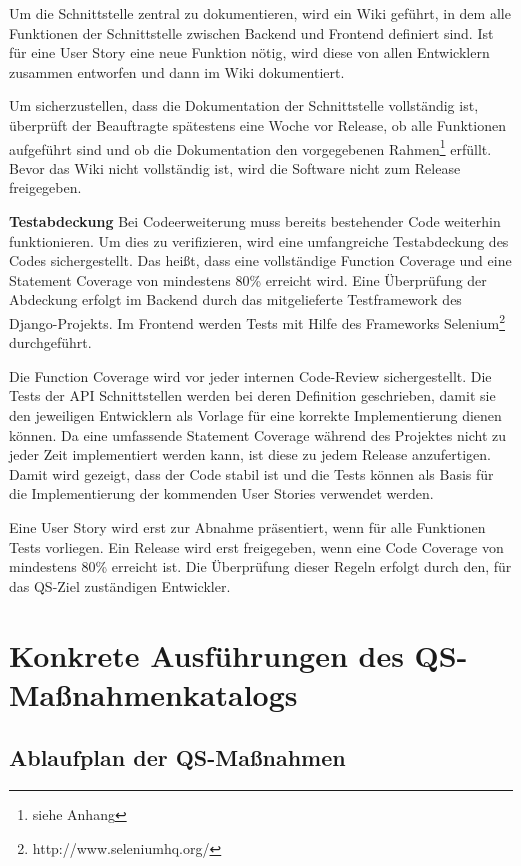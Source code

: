 \documentclass[accentcolor=tud0b,12pt,paper=a4]{tudreport}
\begin{document}
Um die Schnittstelle zentral zu dokumentieren, wird ein Wiki geführt, in dem alle Funktionen der Schnittstelle zwischen Backend und Frontend definiert sind. Ist für eine User Story eine neue Funktion nötig, wird diese von allen Entwicklern zusammen entworfen und dann im Wiki dokumentiert.

Um sicherzustellen, dass die Dokumentation der Schnittstelle vollständig ist, überprüft der Beauftragte spätestens eine Woche vor Release, ob alle Funktionen aufgeführt sind und ob die Dokumentation den vorgegebenen Rahmen\footnote{siehe Anhang} erfüllt. Bevor das Wiki nicht vollständig ist, wird die Software nicht zum Release freigegeben.


\textbf{Testabdeckung}
Bei Codeerweiterung muss bereits bestehender Code weiterhin funktionieren. Um dies zu verifizieren, wird eine umfangreiche Testabdeckung des Codes sichergestellt. Das heißt, dass eine vollständige Function Coverage und eine Statement Coverage von mindestens 80\% erreicht wird. Eine Überprüfung der Abdeckung erfolgt im Backend durch das mitgelieferte Testframework des Django-Projekts. Im Frontend werden Tests mit Hilfe des Frameworks Selenium\footnote{http://www.seleniumhq.org/} durchgeführt.

Die Function Coverage wird vor jeder internen Code-Review sichergestellt. Die Tests der API Schnittstellen werden bei deren Definition geschrieben, damit sie den jeweiligen Entwicklern als Vorlage für eine korrekte Implementierung dienen können. Da eine umfassende Statement Coverage während des Projektes nicht zu jeder Zeit implementiert werden kann, ist diese zu jedem Release anzufertigen. Damit wird gezeigt, dass der Code stabil ist und die Tests können als Basis für die Implementierung der kommenden User Stories verwendet werden.

Eine User Story wird erst zur Abnahme präsentiert, wenn für alle Funktionen Tests vorliegen. Ein Release wird erst freigegeben, wenn eine Code Coverage von mindestens 80\% erreicht ist. Die Überprüfung dieser Regeln erfolgt durch den, für das QS-Ziel zuständigen Entwickler.

\appendix
\chapter{Konkrete Ausführungen des QS-Maßnahmenkatalogs}
\section{Ablaufplan der QS-Maßnahmen}
\end{document}

